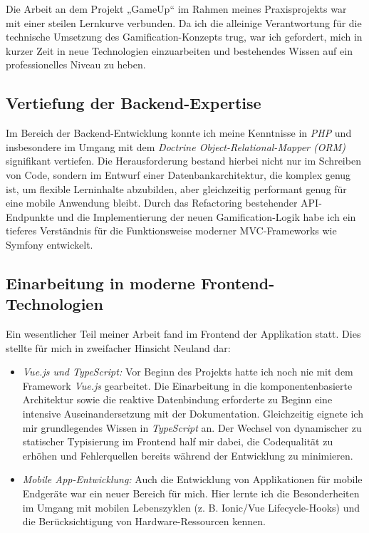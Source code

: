 Die Arbeit an dem Projekt „GameUp“ im Rahmen meines Praxisprojekts war mit einer steilen Lernkurve verbunden. Da ich die alleinige Verantwortung für die technische Umsetzung des 
Gamification-Konzepts trug, war ich gefordert, mich in kurzer Zeit in neue Technologien einzuarbeiten und bestehendes Wissen auf ein professionelles Niveau zu heben.

\subsection{Vertiefung der Backend-Expertise}
Im Bereich der Backend-Entwicklung konnte ich meine Kenntnisse in \textit{PHP} und insbesondere im Umgang mit dem \textit{Doctrine Object-Relational-Mapper (ORM)} signifikant vertiefen. 
Die Herausforderung bestand hierbei nicht nur im Schreiben von Code, sondern im Entwurf einer Datenbankarchitektur, die komplex genug ist, um flexible Lerninhalte abzubilden, aber 
gleichzeitig performant genug für eine mobile Anwendung bleibt. Durch das Refactoring bestehender API-Endpunkte und die Implementierung der neuen Gamification-Logik habe ich ein tieferes 
Verständnis für die Funktionsweise moderner MVC-Frameworks wie Symfony entwickelt.

\subsection{Einarbeitung in moderne Frontend-Technologien}
Ein wesentlicher Teil meiner Arbeit fand im Frontend der Applikation statt. Dies stellte für mich in zweifacher Hinsicht Neuland dar:
\begin{itemize}
    \item \textit{Vue.js und TypeScript:} Vor Beginn des Projekts hatte ich noch nie mit dem Framework \textit{Vue.js} gearbeitet. Die Einarbeitung in die komponentenbasierte Architektur 
    sowie die reaktive Datenbindung erforderte zu Beginn eine intensive Auseinandersetzung mit der Dokumentation. Gleichzeitig eignete ich mir grundlegendes Wissen in \textit{TypeScript} 
    an. Der Wechsel von dynamischer zu statischer Typisierung im Frontend half mir dabei, die Codequalität zu erhöhen und Fehlerquellen bereits während der Entwicklung zu minimieren.
    \item \textit{Mobile App-Entwicklung:} Auch die Entwicklung von Applikationen für mobile Endgeräte war ein neuer Bereich für mich. Hier lernte ich die Besonderheiten im Umgang mit 
    mobilen Lebenszyklen (z. B. Ionic/Vue Lifecycle-Hooks) und die Berücksichtigung von Hardware-Ressourcen kennen.
\end{itemize}

